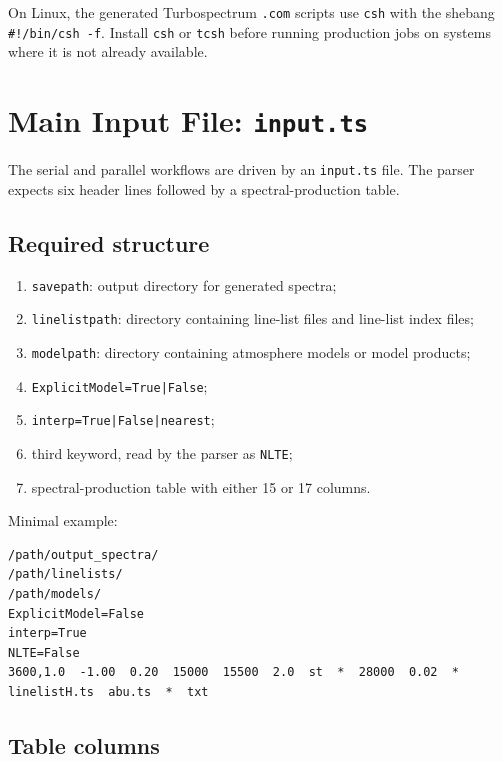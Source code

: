 \documentclass[11pt,a4paper]{article}
\newcommand{\code}[1]{\texttt{#1}}
\begin{document}
\begin{importantbox}
On Linux, the generated Turbospectrum \code{.com} scripts use \code{csh} with the shebang \code{\#!/bin/csh -f}. Install \code{csh} or \code{tcsh} before running production jobs on systems where it is not already available.
\end{importantbox}

\section{Main Input File: \code{input.ts}}

The serial and parallel workflows are driven by an \code{input.ts} file. The parser expects six header lines followed by a spectral-production table.

\subsection{Required structure}

\begin{enumerate}
  \item \code{savepath}: output directory for generated spectra;
  \item \code{linelistpath}: directory containing line-list files and line-list index files;
  \item \code{modelpath}: directory containing atmosphere models or model products;
  \item \code{ExplicitModel=True|False};
  \item \code{interp=True|False|nearest};
  \item third keyword, read by the parser as \code{NLTE};
  \item spectral-production table with either 15 or 17 columns.
\end{enumerate}

Minimal example:

\begin{lstlisting}
/path/output_spectra/
/path/linelists/
/path/models/
ExplicitModel=False
interp=True
NLTE=False
3600,1.0  -1.00  0.20  15000  15500  2.0  st  *  28000  0.02  *  linelistH.ts  abu.ts  *  txt
\end{lstlisting}

\subsection{Table columns}
\end{document}
